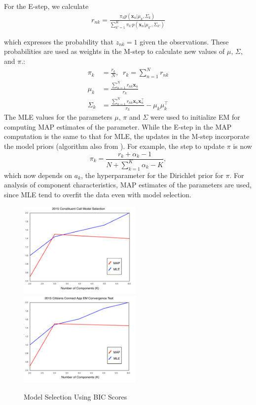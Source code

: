 \documentclass[twoside]{article}
\theoremstyle{theorem}
\theoremstyle{theorem}
\theoremstyle{theorem}
\theoremstyle{lemma}
\theoremstyle{definition}
\theoremstyle{example}
\begin{document}
For the E-step, we calculate   
\begin{align}
r_{nk} = \frac{\pi_k p\left(\mathbf{x}_n | \mu_k, \Sigma_k\right)}{\sum_{k'=1}^K \pi_{k'} p\left(\mathbf{x}_n | \mu_{k'}, \Sigma_{k'}\right)}
\end{align}

which expresses the probability that $z_{nk}=1$ given the observations. These probabilities are used as weights in the M-step to calculate new values of $\mu$, $\Sigma$, and $\pi$.:
\begin{align}
\pi_k &= \frac{r_k}{N},\;\; r_k =\sum_{n=1}^N r_{nk}\\
\mu_k &=\frac{\sum_{n=1}^N r_{nk}\mathbf{x}_n}{r_k}\\
\Sigma_k &= \frac{\sum_{n=1}^N r_{nk} \mathbf{x}_n\mathbf{x}_n^\top}{r_k} - \mu_k\mu_k^\top
\end{align}
The MLE values for the parameters $\mu$, $\pi$ and $\Sigma$ were used to initialize EM for computing MAP estimates of the parameter. While the E-step in the MAP computation is the same to that for MLE, the updates in the M-step incorporate the model priors (algorithm also from \cite{Bishop}). For example, the step to update $\pi$ is now 
\begin{equation} 
\pi_k = \frac{r_k + \alpha_k - 1}{N + \sum_{k=1}^K \alpha_k - K},
\end{equation}
which now depends on $a_k$, the hyperparameter for the Dirichlet prior for $\pi$. 
For analysis of component characteristics, MAP estimates of the parameters are used, since MLE tend to overfit the data even with model selection. 
\begin{figure}[h!]
\begin{center}
\includegraphics[width=60mm]{Call_bic}
\includegraphics[width=60mm]{App_bic}
\caption{Model Selection Using BIC Scores}\label{fig:bic}
\end{center}
\vskip -0.2in
\end{figure} 
\end{document}

